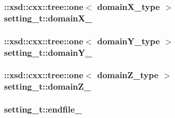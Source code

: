 \subsubsection[{\texorpdfstring{domain\+X\+\_\+}{domainX_}}]{\setlength{\rightskip}{0pt plus 5cm}\+::xsd\+::cxx\+::tree\+::one$<$ {\bf domain\+X\+\_\+type} $>$ setting\+\_\+t\+::domain\+X\+\_\+\hspace{0.3cm}{\ttfamily [protected]}}\hypertarget{classsetting__t_a5bada1ac375ff0880996b3a260723a6d}{}\label{classsetting__t_a5bada1ac375ff0880996b3a260723a6d}
\subsubsection[{\texorpdfstring{domain\+Y\+\_\+}{domainY_}}]{\setlength{\rightskip}{0pt plus 5cm}\+::xsd\+::cxx\+::tree\+::one$<$ {\bf domain\+Y\+\_\+type} $>$ setting\+\_\+t\+::domain\+Y\+\_\+\hspace{0.3cm}{\ttfamily [protected]}}\hypertarget{classsetting__t_ac1925afc572245a536585b6cd0fb4be8}{}\label{classsetting__t_ac1925afc572245a536585b6cd0fb4be8}
\subsubsection[{\texorpdfstring{domain\+Z\+\_\+}{domainZ_}}]{\setlength{\rightskip}{0pt plus 5cm}\+::xsd\+::cxx\+::tree\+::one$<$ {\bf domain\+Z\+\_\+type} $>$ setting\+\_\+t\+::domain\+Z\+\_\+\hspace{0.3cm}{\ttfamily [protected]}}\hypertarget{classsetting__t_a41da97081f66667b63f16613456805fb}{}\label{classsetting__t_a41da97081f66667b63f16613456805fb}
\subsubsection[{\texorpdfstring{endfile\+\_\+}{endfile_}}]{ setting\+\_\+t\+::endfile\+\_\+\hspace{0.3cm}{\ttfamily [protected]}}\hypertarget{classsetting__t_a342b748a69b54f564e796b742eefc51c}{}\label{classsetting__t_a342b748a69b54f564e796b742eefc51c}
